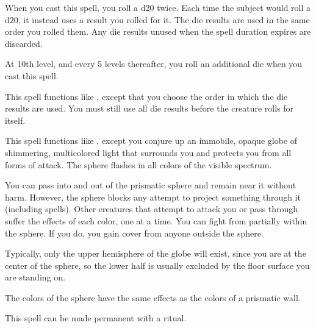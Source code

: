 \spellrng{\rngmed}
\spelldur{\durshort}
\begin{spelleffect}
    When you cast this spell, you roll a d20 twice. Each time the subject would roll a d20, it instead uses a result you rolled for it. The die results are used in the same order you rolled them. Any die results unused when the spell duration expires are discarded.

    At 10th level, and every 5 levels thereafter, you roll an additional die when you cast this spell.
\end{spelleffect}

\begin{spelleffect}
    This spell functions like , except that you choose the order in which the die results are used. You must still use all die results before the creature rolls for itself.
\end{spelleffect}

\begin{spelleffect}
  This spell functions like , except you conjure up an immobile, opaque globe of shimmering, multicolored light that surrounds you and protects you from all forms of attack. The sphere flashes in all colors of the visible spectrum. 
  \par You can pass into and out of the prismatic sphere and remain near it without harm. However, the sphere blocks any attempt to project something through it (including spells). Other creatures that attempt to attack you or pass through suffer the effects of each color, one at a time. You can fight from partially within the sphere. If you do, you gain cover from anyone outside the sphere.
  \par Typically, only the upper hemisphere of the globe will exist, since you are at the center of the sphere, so the lower half is usually excluded by the floor surface you are standing on.
  \par The colors of the sphere have the same effects as the colors of a prismatic wall.
\end{spelleffect}
\begin{spellnotes}
This spell can be made permanent with a  ritual.
\end{spellnotes}

